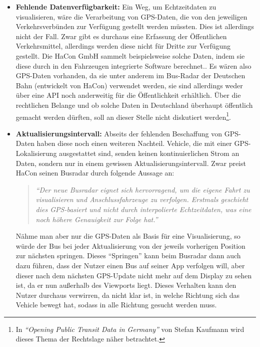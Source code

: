     \begin{itemize}[label={}]
      \item \textbf{Fehlende Datenverfügbarkeit:}
        Ein Weg, um Echtzeitdaten zu visualisieren, wäre die Verarbeitung von GPS-Daten, die von den jeweiligen Verkehrsverbünden zur Verfügung gestellt werden müssten. Dies ist allerdings nicht der Fall. Zwar gibt es durchaus eine Erfassung der Öffentlichen Verkehrsmittel, allerdings werden diese nicht für Dritte zur Verfügung gestellt. Die HaCon GmbH sammelt beispielsweise solche Daten, indem sie diese durch in den Fahrzeugen integrierte Software berechnet.\parencite{havasBusradar}. Es wären also GPS-Daten vorhanden, da sie unter anderem im Bus-Radar der Deutschen Bahn (entwickelt von HaCon) verwendet werden, sie sind allerdings weder über eine API noch anderweitig für die Öffentlichkeit erhältlich. Über die rechtlichen Belange und ob solche Daten in Deutschland überhaupt öffentlich gemacht werden dürften, soll an dieser Stelle nicht diskutiert werden\footnote{In \textit{"`Opening Public Transit Data in Germany"'} von Stefan Kaufmann\parencite{kaufmann} wird dieses Thema der Rechtslage näher betrachtet.}.

      \item \textbf{Aktualisierungsintervall:}
        Abseits der fehlenden Beschaffung von GPS-Daten haben diese noch einen weiteren Nachteil. Vehicle, die mit einer GPS-Lokalisierung ausgestattet sind, senden keinen kontinuierlichen Strom an Daten, sondern nur in einem gewissen Aktualisierungsintervall. Zwar preist HaCon seinen Busradar durch folgende Aussage an: 

        \begin{quote}
          \textit{"`Der neue Busradar eignet sich hervorragend, um die eigene Fahrt zu visualisieren und Anschlussfahrzeuge zu verfolgen. Erstmals geschieht dies GPS-basiert und nicht durch interpolierte Echtzeitdaten, was eine noch höhere Genauigkeit zur Folge hat."'}\parencite{havasBusradar}
        \end{quote}

        Nähme man aber nur die GPS-Daten als Basis für eine Visualisierung, so würde der Bus bei jeder Aktualisierung von der jeweils vorherigen Position zur nächsten springen. Dieses "`Springen"' kann beim Busradar dann auch dazu führen, dass der Nutzer einen Bus auf seiner App verfolgen will, aber dieser nach dem nächsten GPS-Update nicht mehr auf dem Display zu sehen ist, da er nun außerhalb des Viewports liegt. Dieses Verhalten kann den Nutzer durchaus verwirren, da nicht klar ist, in welche Richtung sich das Vehicle bewegt hat, sodass in alle Richtung gesucht werden muss.


\end{itemize}
